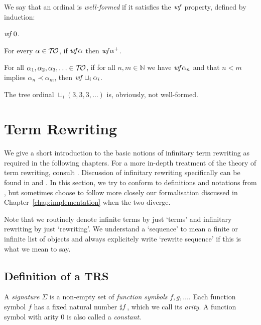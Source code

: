 \begin{definition}%
  We say that an ordinal is \emph{well-formed} if it satisfies the
  $\mathit{wf}$ property, defined by induction:
\begin{compactenum}
  \item
    $\mathit{wf} \, 0$.
  \item
    For every $\alpha \in \mathcal{T\!O}$, if $\mathit{wf} \alpha$ then
    $\mathit{wf} \alpha^+$.
  \item
    For all $\alpha_1, \alpha_2, \alpha_3, \ldots \in \mathcal{T\!O}$, if for
    all $n,m \in \mathbb{N}$ we have $\mathit{wf} \alpha_n$ and that
    $n < m$ implies $\alpha_n \prec \alpha_m$, then $\mathit{wf}
    \sqcup_i \alpha_i$.
\end{compactenum}
\end{definition}

The tree ordinal $\sqcup_i (3, 3, 3, \ldots)$ is, obviously, not
well-formed.


\section{Term Rewriting}\label{sec:rewriting}

We give a short introduction to the basic notions of infinitary term
rewriting as required in the following chapters. For a more in-depth
treatment of the theory of term rewriting, consult
\citet{terese-03}. Discussion of infinitary rewriting specifically
can be found in \citet[Chapter 12]{terese-03} and
\citet{klop-de-vrijer-05}. In this section, we try to conform to
definitions and notations from \citet{terese-03}, but sometimes choose
to follow more closely our \Coq formalisation discussed in
Chapter~\ref{chap:implementation} when the two diverge.

Note that we routinely denote infinite terms by just `terms' and infinitary
rewriting by just `rewriting'. We understand a `sequence' to mean a finite or
infinite list of objects and always explicitely write `rewrite
sequence' if this is what we mean to say.


\subsection{Definition of a TRS}\label{sub:trs}

\begin{definition}%
A \emph{signature} $\Sigma$ is a non-empty set of \emph{function symbols} $f,
g, \ldots$. Each function symbol $f$ has a fixed natural number
$\sharp f$, which we call its \emph{arity}. A function symbol with
arity $0$ is also called a \emph{constant}.
\end{definition}


